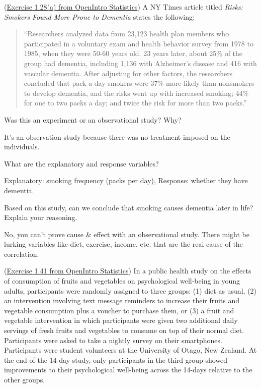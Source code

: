 \documentclass[12pt]{exam}
\newcounter{countA}
\begin{document}
\begin{questions}
\setcounter{question}{\value{countA}}
\item (\href{http://people.hsc.edu/faculty-staff/blins/books/OpenIntroStats4e.pdf\#eoce.1.28}{Exercise 1.28(a) from OpenIntro Statistics}) A NY Times article titled \emph{Risks: Smokers Found More Prone to Dementia} states the following:

\begin{quote}
``Researchers analyzed data from 23,123 health plan members who
participated in a voluntary exam and health behavior survey from 1978 to
1985, when they were 50-60 years old. 23 years later, about 25\% of the
group had dementia, including 1,136 with Alzheimer's disease and 416
with vascular dementia. After adjusting for other factors, the
researchers concluded that pack-a-day smokers were 37\% more likely than
nonsmokers to develop dementia, and the risks went up with increased
smoking; 44\% for one to two packs a day; and twice the risk for more
than two packs.''
\end{quote}

\begin{parts}
\item
  Was this an experiment or an observational study? Why?
\begin{solution}
It's an observation study because there was no treatment imposed on the individuals. 
\end{solution}
\vfill
\item
  What are the explanatory and response variables?
\begin{solution}
Explanatory: smoking frequency (packs per day), Response: whether they have dementia.
\end{solution}
\vfill
\item
  Based on this study, can we conclude that smoking causes dementia
  later in life? Explain your reasoning.
\vfill
\begin{solution}
No, you can't prove cause \& effect with an observational study. There might be lurking variables like diet, exercise, income, etc. that are the real cause of the correlation. 
\end{solution}
\end{parts}


\question
  (\href{http://people.hsc.edu/faculty-staff/blins/books/OpenIntroStats4e.pdf\#eoce.1.41}{Exercise 1.41 from OpenIntro Statistics}) In a public health study on the effects of consumption of fruits and
  vegetables on psychological well-being in young adults, participants
  were randomly assigned to three groups: (1) diet as usual, (2) an
  intervention involving text message reminders to increase their fruits
  and vegetable consumption plus a voucher to purchase them, or (3) a
  fruit and vegetable intervention in which participants were given two
  additional daily servings of fresh fruits and vegetables to consume on
  top of their normal diet. Participants were asked to take a nightly
  survey on their smartphones. Participants were student volunteers at
  the University of Otago, New Zealand. At the end of the 14-day study,
  only participants in the third group showed improvements to their
  psychological well-being across the 14-days relative to the other
  groups.


\end{questions}
\end{document}
